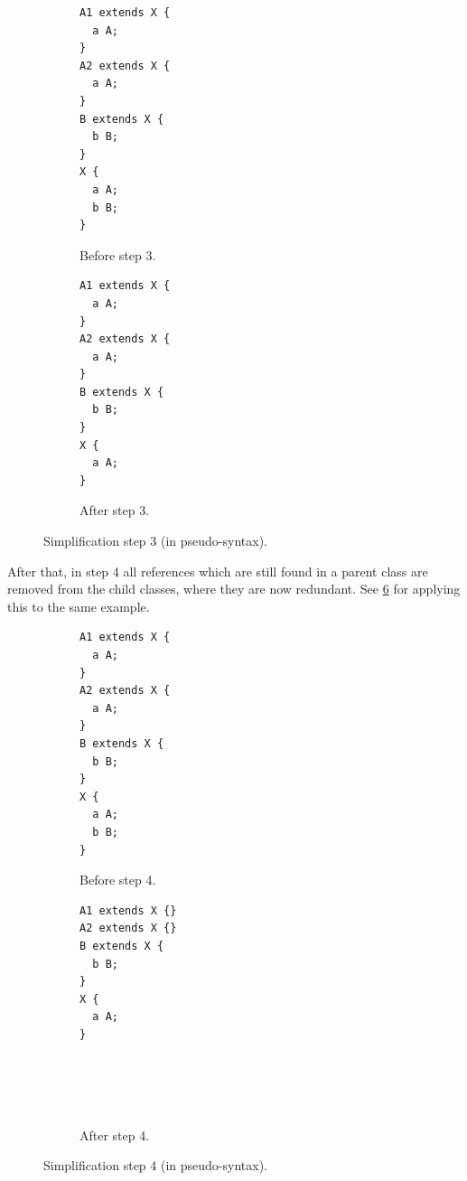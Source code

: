 \begin{figure}[ht]
  \begin{subfigure}[t]{0.45\textwidth}
    \begin{lstlisting}
A1 extends X {
  a A;
}
A2 extends X {
  a A;
}
B extends X {
  b B;
}
X {
  a A;
  b B;
}
    \end{lstlisting}
    \caption{Before step 3.}
    \label{fig:simplify-7.4.3-before}
  \end{subfigure}
  \begin{subfigure}[t]{0.45\textwidth}
    \begin{lstlisting}[showlines=true]
A1 extends X {
  a A;
}
A2 extends X {
  a A;
}
B extends X {
  b B;
}
X {
  a A;
}

    \end{lstlisting}
    \caption{After step 3.}
    \label{fig:simplify-7.4.3-after}
  \end{subfigure}
  \caption[Simplification step 3.]{Simplification step 3 (in pseudo-syntax).}
  \label{fig:simplify-7.4.3}
\end{figure}

After that, in step 4 all references which are still found in a parent class
are removed from the child classes, where they are now redundant.
See \cref{fig:simplify-7.4.4} for applying this to the same example.

\begin{figure}[ht]
  \begin{subfigure}[t]{0.45\textwidth}
    \begin{lstlisting}
A1 extends X {
  a A;
}
A2 extends X {
  a A;
}
B extends X {
  b B;
}
X {
  a A;
  b B;
}
    \end{lstlisting}
    \caption{Before step 4.}
    \label{fig:simplify-7.4.4-before}
  \end{subfigure}
  \begin{subfigure}[t]{0.45\textwidth}
    \begin{lstlisting}[showlines=true]
A1 extends X {}
A2 extends X {}
B extends X {
  b B;
}
X {
  a A;
}





    \end{lstlisting}
    \caption{After step 4.}
    \label{fig:simplify-7.4.4-after}
  \end{subfigure}
  \caption[Simplification step 4.]{Simplification step 4 (in pseudo-syntax).}
  \label{fig:simplify-7.4.4}
\end{figure}

